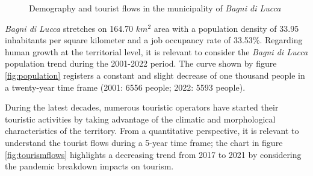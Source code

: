 \documentclass[sustainability,article,submit,pdftex,moreauthors]{Definitions/mdpi}
\begin{document}
\begin{figure}
\hfill
{}
\caption{Demography and tourist flows in the municipality of \emph{Bagni di Lucca}}
\end{figure}


\emph{Bagni di Lucca} stretches on 164.70 $km^2$ area with a population density of 33.95 inhabitants per square kilometer and a job occupancy rate of 33.53\%. Regarding human growth at the territorial level, it is relevant to consider the \emph{Bagni di Lucca} population trend during the 2001-2022 period. The curve shown by figure \ref{fig:population} registers a constant and slight decrease of one thousand people in a twenty-year time frame (2001: 6556 people; 2022: 5593 people). 

During the latest decades, numerous touristic operators have started their touristic activities by taking advantage of the climatic and morphological characteristics of the territory. From a quantitative perspective, it is relevant to understand the tourist flows during a 5-year time frame; the chart in figure \ref{fig:tourismflows} highlights a decreasing trend from 2017 to 2021 by considering the pandemic breakdown impacts on tourism.
\end{document}
